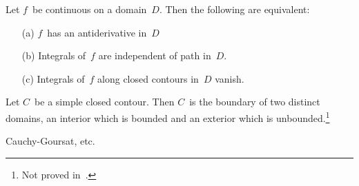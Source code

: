 \begin{cor}
Let \(f\)~be continuous on a domain~\(D\). Then the following are equivalent:
\begin{enumerate}[itemsep=0pt]
\item[(a)] \(f\)~has an antiderivative in~\(D\)
\item[(b)] Integrals of~\(f\) are independent of path in~\(D\).
\item[(c)] Integrals of~\(f\) along closed contours in~\(D\) vanish.
\end{enumerate}
\end{cor}

\begin{thm}[Jordan]
Let \(C\)~be a simple closed contour. Then \(C\)~is the boundary of two distinct domains, an interior which is bounded and an exterior which is unbounded.\footnote{Not proved in~\cite{brown04}.}
\end{thm}
\begin{app}
Cauchy-Goursat, etc.
\end{app}

